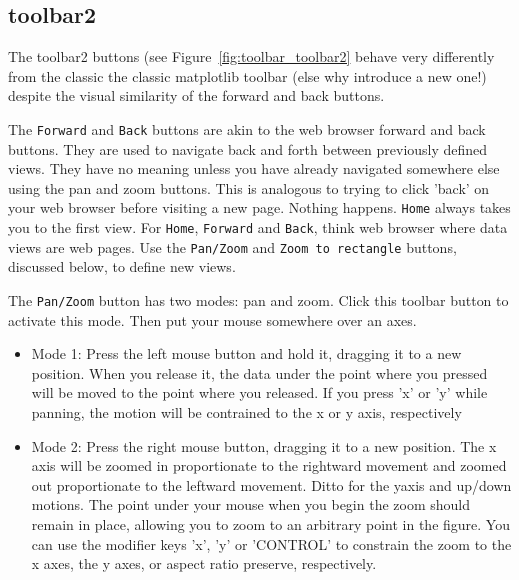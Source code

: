 \documentclass[]{book}
\begin{document}

\subsection{toolbar2}
\label{sec:toolbar_toolbar2}

The toolbar2 buttons (see Figure~\ref{fig:toolbar_toolbar2} behave
very differently from the classic the classic matplotlib toolbar (else
why introduce a new one!) despite the visual similarity of the forward
and back buttons.

The \texttt{Forward} and \texttt{Back} buttons are akin to the web browser
forward and back buttons.  They are used to navigate back and forth
between previously defined views.  They have no meaning unless you
have already navigated somewhere else using the pan and zoom buttons.
This is analogous to trying to click 'back' on your web browser before
visiting a new page.  Nothing happens.  \texttt{Home} always takes you to
the first view.  For \texttt{Home}, \texttt{Forward} and \texttt{Back}, think web
browser where data views are web pages.  Use the \texttt{Pan/Zoom} and
\texttt{Zoom to rectangle} buttons, discussed below, to define new views.

The \texttt{Pan/Zoom} button has two modes: pan and zoom.  Click this
toolbar button to activate this mode.  Then put your mouse somewhere
over an axes.

\begin{itemize}
\item Mode 1: Press the left mouse button and hold it, dragging it to
  a new position.  When you release it, the data under the point where
  you pressed will be moved to the point where you released.  If you
  press 'x' or 'y' while panning, the motion will be contrained to the
  x or y axis, respectively
  
\item Mode 2: Press the right mouse button, dragging it to a new
  position.  The x axis will be zoomed in proportionate to the
  rightward movement and zoomed out proportionate to the leftward
  movement.  Ditto for the yaxis and up/down motions.  The point under
  your mouse when you begin the zoom should remain in place, allowing
  you to zoom to an arbitrary point in the figure.  You can use the
  modifier keys 'x', 'y' or 'CONTROL' to constrain the zoom to the x
  axes, the y axes, or aspect ratio preserve, respectively.  

\end{itemize}
\end{document}
